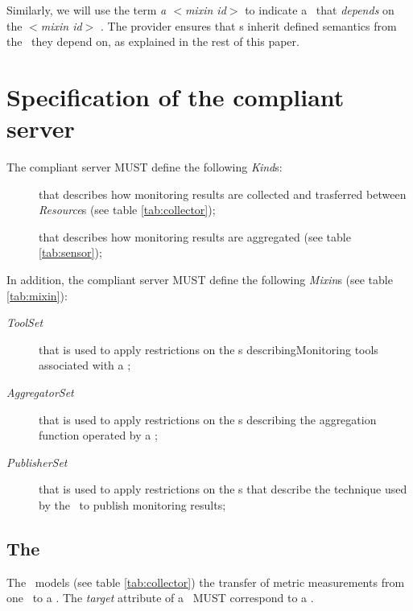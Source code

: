 \documentclass[12pt]{article}  %
\begin{document}
Similarly, we will use the term {\em a $<$mixin id$>$ \mi} to indicate a \mi\ that {\em depends} on the {\em $<$mixin id$>$} \mi. The provider ensures that \mi s inherit defined semantics from the \mi\ they depend on, as explained in the rest of this paper. 

\section{Specification of the compliant server}

The compliant server MUST define the following {\em Kind}s:

\begin{description}

\item [\coll] that describes how monitoring results are collected and trasferred between {\em Resource}s (see table \ref{tab:collector});

\item [\sens] that describes how monitoring results are aggregated (see table  \ref{tab:sensor});

\end{description}

In addition, the compliant server MUST define the following {\em Mixin}s (see table \ref{tab:mixin}): 

\begin{description}

\item [{\em ToolSet}] that is used to apply restrictions on the \mi s describingMonitoring tools associated with a \coll;

\item [{\em AggregatorSet}] that is used to apply restrictions on the \mi s describing the aggregation function operated by a \sens;

\item [{\em PublisherSet}] that is used to apply restrictions on the \mi s that describe the technique used by the \sens\ to publish monitoring results;

\end{description}



\subsection{The \coll}



The \coll\ models  (see table \ref{tab:collector}) the transfer of metric measurements from one \rs\ to a \sens . The {\em target} attribute of a \coll\ MUST correspond to a \sens .
\end{document}
